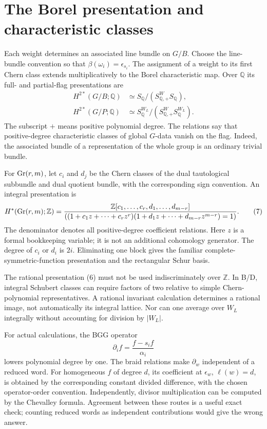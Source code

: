 \documentclass[11pt,letterpaper]{article}
\newcommand{\Z}{\mathbb Z}\newcommand{\Q}{\mathbb Q}\newcommand{\C}{\mathbb C}
\newcommand{\eps}{\epsilon}\newcommand{\poly}{\mathrm{poly}}
\theoremstyle{definition}\newtheorem{definition}[theorem]{Definition}
\begin{document}
\section{The Borel presentation and characteristic classes}
Each weight determines an associated line bundle on \(G/B\).
Choose the line-bundle convention so that
\(\beta(\omega_i)=\eps_{s_i}\). The assignment of a weight to its first
Chern class extends multiplicatively to the Borel characteristic map.
Over \(\Q\) its full- and partial-flag presentations are
\[
\begin{split}
 H^{2*}(G/B;\Q)&\simeq S_\Q/(S_{\Q,+}^W S_\Q),\\
 H^{2*}(G/P;\Q)&\simeq
 S_\Q^{W_L}/(S_{\Q,+}^W S_\Q^{W_L}).
\end{split}
\tag{6}
\]
The subscript \(+\) means positive polynomial degree. The relations
say that positive-degree characteristic classes of global \(G\)-data
vanish on the flag. Indeed, the associated bundle of a representation
of the whole group is an ordinary trivial bundle.

For \(\operatorname{Gr}(r,m)\), let \(c_i\) and \(d_j\) be the Chern classes of
the dual tautological subbundle and dual quotient bundle, with the
corresponding sign convention. An integral presentation is
\[
 H^*(\Gr(r,m);\Z)=
 \frac{\Z[c_1,\ldots,c_r,d_1,\ldots,d_{m-r}]}
 {((1+c_1z+\cdots+c_rz^r)(1+d_1z+\cdots+d_{m-r}z^{m-r})=1)}.
 \tag{7}
\]
The denominator denotes all positive-degree coefficient relations.
Here \(z\) is a formal bookkeeping variable; it is not an additional
cohomology generator. The degree of \(c_i\) or \(d_i\) is \(2i\).
Eliminating one block gives the familiar complete-symmetric-function
presentation and the rectangular Schur basis.

The rational presentation (6) must not be used indiscriminately over
\(\Z\). In B/D, integral Schubert classes can require factors of two
relative to simple Chern-polynomial representatives. A rational
invariant calculation determines a rational image, not automatically
its integral lattice. Nor can one average over \(W_L\) integrally
without accounting for division by \(|W_L|\).

For actual calculations, the BGG operator
\[
 \partial_i f=\frac{f-s_i f}{\alpha_i}
 \tag{8}
\]
lowers polynomial degree by one. The braid relations make
\(\partial_w\) independent of a reduced word. For homogeneous
\(f\) of degree \(d\), its coefficient at \(\eps_w\), \(\ell(w)=d\),
is obtained by the corresponding constant divided difference, with
the chosen operator-order convention. Independently, divisor
multiplication can be computed by the Chevalley formula. Agreement
between these routes is a useful exact check; counting reduced words
as independent contributions would give the wrong answer.
\end{document}
